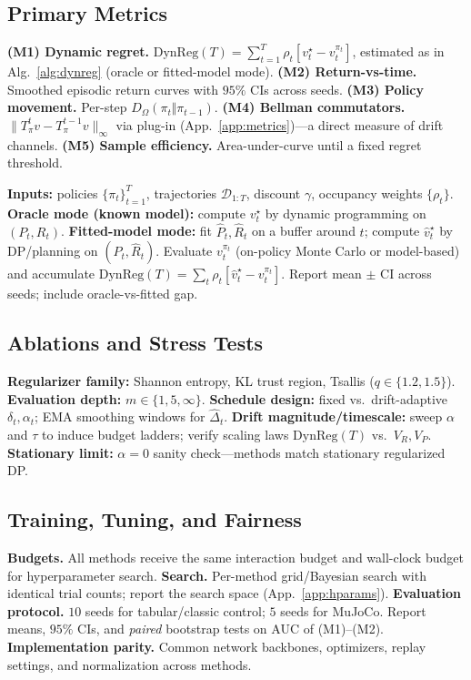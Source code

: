 \documentclass{article}
\theoremstyle{plain}
\theoremstyle{definition}
\theoremstyle{remark}
\newcommand{\1}{\mathbbm{1}}
\newcommand{\mc}[1]{\mathcal{#1}}
\begin{document}
\subsection{Primary Metrics}
\label{subsec:metrics}
\textbf{(M1) Dynamic regret.} $\mathrm{DynReg}(T)=\sum_{t=1}^T \rho_t\!\left[v_t^\star - v^{\pi_t}_t\right]$, estimated as in Alg.~\ref{alg:dynreg} (oracle or fitted-model mode).
\textbf{(M2) Return-vs-time.} Smoothed episodic return curves with $95\%$ CIs across seeds.
\textbf{(M3) Policy movement.} Per-step $D_\Omega(\pi_t\Vert\pi_{t-1})$.
\textbf{(M4) Bellman commutators.} $\|T^t_{\pi}v - T^{t-1}_{\pi}v\|_\infty$ via plug-in (App.~\ref{app:metrics})—a direct measure of drift channels.
\textbf{(M5) Sample efficiency.} Area-under-curve until a fixed regret threshold.

\begin{algorithm}[t]
\caption{Estimating Dynamic Regret (Oracle or Fitted-Model)}
\label{alg:dynreg}
\begin{algorithmic}[1]
\STATE \textbf{Inputs:} policies $\{\pi_t\}_{t=1}^T$, trajectories $\mc{D}_{1:T}$, discount $\gamma$, occupancy weights $\{\rho_t\}$.
\STATE \textbf{Oracle mode (known model):} compute $v_t^\star$ by dynamic programming on $(P_t,R_t)$.
\STATE \textbf{Fitted-model mode:} fit $\widehat P_t,\widehat R_t$ on a buffer around $t$; compute $\hat v_t^\star$ by DP/planning on $(\widehat P_t,\widehat R_t)$.
\STATE Evaluate $v^{\pi_t}_t$ (on-policy Monte Carlo or model-based) and accumulate $\mathrm{DynReg}(T)=\sum_t \rho_t\!\left[\hat v_t^\star - v^{\pi_t}_t\right]$.
\STATE Report mean $\pm$ CI across seeds; include oracle-vs-fitted gap.
\end{algorithmic}
\end{algorithm}

\subsection{Ablations and Stress Tests}
\label{subsec:ablations}
\textbf{Regularizer family:} Shannon entropy, KL trust region, Tsallis ($q\in\{1.2,1.5\}$).
\textbf{Evaluation depth:} $m\in\{1,5,\infty\}$.
\textbf{Schedule design:} fixed vs.\ drift-adaptive $\delta_t,\alpha_t$; EMA smoothing windows for $\widehat{\Delta}_t$.
\textbf{Drift magnitude/timescale:} sweep $\alpha$ and $\tau$ to induce budget ladders; verify scaling laws $\mathrm{DynReg}(T)$ vs.\ $V_R,V_P$.
\textbf{Stationary limit:} $\alpha=0$ sanity check—methods match stationary regularized DP.

\subsection{Training, Tuning, and Fairness}
\label{subsec:fairness}
\textbf{Budgets.} All methods receive the same interaction budget and wall-clock budget for hyperparameter search.
\textbf{Search.} Per-method grid/Bayesian search with identical trial counts; report the search space (App.~\ref{app:hparams}).
\textbf{Evaluation protocol.} $10$ seeds for tabular/classic control; $5$ seeds for MuJoCo. Report means, $95\%$ CIs, and \emph{paired} bootstrap tests on AUC of (M1)--(M2).
\textbf{Implementation parity.} Common network backbones, optimizers, replay settings, and normalization across methods.
\end{document}
